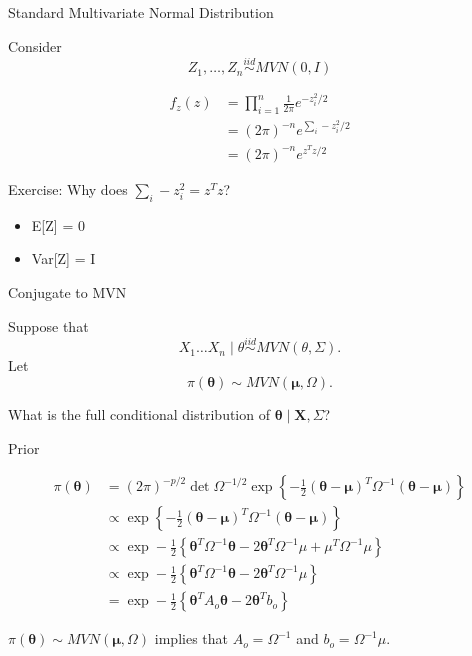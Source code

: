 \documentclass[ignorenonframetext,]{beamer}
\providecommand{\tightlist}{%
  \setlength{\itemsep}{0pt}\setlength{\parskip}{0pt}}
\newcommand{\btheta}{{\bm\theta}}
\newcommand{\bmu}{\bm{\mu}}
\newcommand{\bX}   {\bm{X}}
\begin{document}
\begin{frame}{Standard Multivariate Normal Distribution}

Consider \[Z_1,\ldots,Z_n \stackrel{iid}{\sim} MVN(0,I)\]

\begin{align}
f_z(z) &= \prod_{i=1}^n \frac{1}{2\pi} e^{-z_i^2/2}\\
& = (2\pi)^{-n} e^{\sum_i-z_i^2/2}\\
& = (2\pi)^{-n} e^{z^Tz/2}
\end{align}

Exercise: Why does \(\sum_i-z_i^2 = z^Tz\)?

\begin{itemize}
\tightlist
\item
  E{[}Z{]} = 0
\item
  Var{[}Z{]} = I
\end{itemize}

\end{frame}

\begin{frame}{Conjugate to MVN}

Suppose that
\[X_1 \ldots X_n \mid \theta \stackrel{iid}{\sim} MVN(\theta, \Sigma). \]
Let \[\pi(\btheta) \sim MVN(\bmu, \Omega). \]

What is the full conditional distribution of
\(\btheta \mid \bX, \Sigma\)?

\end{frame}

\begin{frame}{Prior}

\begin{align}
\pi(\btheta) &= {\left(2\pi\right)}^{-p/2}\det{\Omega}^{-1/2} \exp{\left\{-\frac{1}{2} (\btheta-\bmu)^T\Omega^{-1} (\btheta - \bmu)\right\}} \\
& \propto \exp{\left\{-\frac{1}{2} (\btheta-\bmu)^T\Omega^{-1} (\btheta - \bmu)\right\}} \\
& \propto \exp-\frac{1}{2} {\left \{\btheta^T\Omega^{-1} \btheta - 2 \btheta^T \Omega^{-1} \mu + \mu^T \Omega^{-1} \mu \right \}} \\
& \propto \exp-\frac{1}{2} {\left \{\btheta^T\Omega^{-1} \btheta - 2 \btheta^T \Omega^{-1} \mu  \right \}}\\
&= \exp-\frac{1}{2} {\left \{\btheta^TA_o \btheta - 2 \btheta^T  b_o  \right \}}
\end{align}

\(\pi(\btheta) \sim MVN(\bmu, \Omega)\) implies that
\(A_o = \Omega^{-1}\) and \(b_o = \Omega^{-1} \mu.\)

\end{frame}
\end{document}
